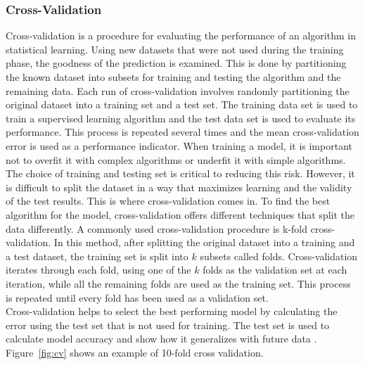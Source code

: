 \subsubsection*{Cross-Validation}
Cross-validation is a procedure for evaluating the performance of an algorithm in statistical learning. Using new datasets that were not used during the training phase, the goodness of the prediction is examined. This is done by partitioning the known dataset into subsets for training and testing the algorithm and the remaining data.
Each run of cross-validation involves randomly partitioning the original dataset into a training set and a test set. The training data set is used to train a supervised learning algorithm and the test data set is used to evaluate its performance. This process is repeated several times and the mean cross-validation error is used as a performance indicator.
When training a model, it is important not to overfit it with complex algorithms or underfit it with simple algorithms. The choice of training and testing set is critical to reducing this risk. However, it is difficult to split the dataset in a way that maximizes learning and the validity of the test results. This is where cross-validation comes in. To find the best algorithm for the model, cross-validation offers different techniques that split the data differently. \clearpage
A commonly used cross-validation procedure is k-fold cross-validation. In this method, after splitting the original dataset into a training and a test dataset, the training set is split into $k$ subsets called folds. Cross-validation iterates through each fold, using one of the $k$ folds as the validation set at each iteration, while all the remaining folds are used as the training set. This process is repeated until every fold has been used as a validation set. \\
Cross-validation helps to select the best performing model by calculating the error using the test set that is not used for training. The test set is used to calculate model accuracy and show how it generalizes with future data \autocite[][]{fushiki2011estimation}. Figure~\ref{fig:cv} shows an example of 10-fold cross validation.
